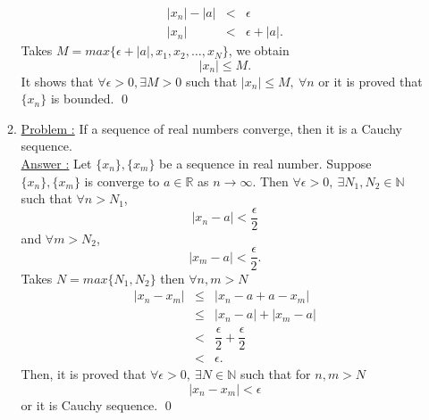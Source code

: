 \documentclass[a4paper,10pt]{article}
\newcommand{\R}{\mathbb{R}}
\newcommand{\N}{\mathbb{N}}
\begin{document}
\begin{enumerate}
\begin{enumerate}
\begin{eqnarray}
		|x_{n}|-|a| &<& \epsilon \\ \nonumber
		|x_{n}| &<& \epsilon + |a|.
		\end{eqnarray}
		Takes $ M = max\{ \epsilon + |a|, x_{1}, x_{2}, \dots, x_{N} \} $, we obtain
		\[ |x_{n}| \leq M. \]
		It shows that $ \forall \epsilon>0, \exists M>0 $ such that $ |x_{n}| \leq M, \ \forall n $ or it is proved that $ \{x_{n}\} $ is bounded. \qed
		\item \underline{Problem :} If a sequence of real numbers converge, then it is a Cauchy sequence.\\
		\underline{Answer :} Let $ \{x_{n}\}, \{x_{m}\} $ be a sequence in real number. Suppose $ \{x_{n}\}, \{x_{m}\} $ is converge to $ a \in \R $ as $ n \rightarrow \infty $. Then $ \forall \epsilon > 0, \ \exists N_{1},N_{2}\in \N $ such that $ \forall n > N_{1} $, \[|x_{n}-a|<\dfrac{\epsilon}{2}\]
		and  $ \forall m > N_{2} $, \[|x_{m}-a|<\dfrac{\epsilon}{2}.\]
		Takes $ N=max\{N_{1},N_{2}\} $ then $ \forall n, m > N $
		\begin{eqnarray}\nonumber
		|x_{n}-x_{m}| & \leq & |x_{n}-a+a-x_{m}| \\ \nonumber
		& \leq & |x_{n}-a|+|x_{m}-a| \\ \nonumber
		& < & \dfrac{\epsilon}{2}+\dfrac{\epsilon}{2} \\ \nonumber
		& < & \epsilon.		
		\end{eqnarray}
		Then, it is proved that $ \forall \epsilon>0, \ \exists N \in \N $ such that for $ n,m > N $ \[ |x_{n}-x_{m}|<\epsilon \] or it is Cauchy sequence. \qed
	\end{enumerate}
	
\end{enumerate}
\end{document}
